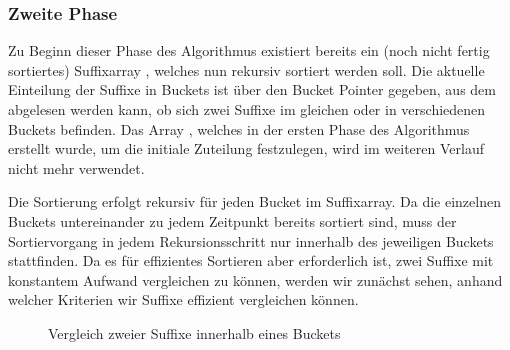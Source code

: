 \subsubsection{Zweite Phase}
\label{bpr:algorithmus:phase2}

Zu Beginn dieser Phase des Algorithmus existiert bereits ein (noch nicht fertig sortiertes) Suffixarray \sa, welches nun rekursiv sortiert werden soll. Die aktuelle Einteilung der Suffixe in Buckets ist über den Bucket Pointer \bptr gegeben, aus dem abgelesen werden kann, ob sich zwei Suffixe im gleichen oder in verschiedenen Buckets befinden. Das Array \bkt, welches in der ersten Phase des Algorithmus erstellt wurde, um die initiale Zuteilung festzulegen, wird im weiteren Verlauf nicht mehr verwendet.\par
Die Sortierung erfolgt rekursiv für jeden Bucket im Suffixarray. Da die einzelnen Buckets untereinander zu jedem Zeitpunkt bereits sortiert sind, muss der Sortiervorgang in jedem Rekursionsschritt nur innerhalb des jeweiligen Buckets stattfinden. Da es für effizientes Sortieren aber erforderlich ist, zwei Suffixe mit konstantem Aufwand vergleichen zu können, werden wir zunächst sehen, anhand welcher Kriterien wir Suffixe effizient vergleichen können.
\begin{figure}[ht]
	\caption{Vergleich zweier Suffixe innerhalb eines Buckets}
	\label{fig:inner_bucket}
\end{figure}
